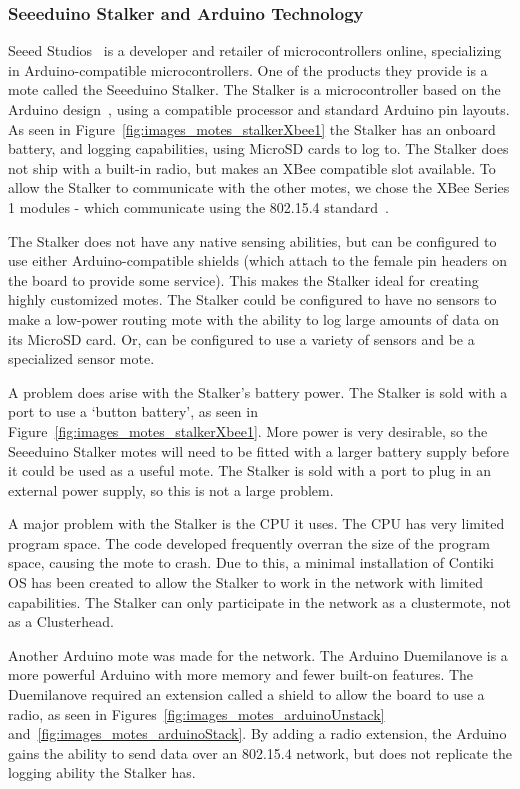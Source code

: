 \subsubsection {Seeeduino Stalker and Arduino Technology}
	Seeed Studios~\cite{seedstalker} is a developer and retailer of microcontrollers online, 
	specializing in Arduino-compatible microcontrollers. One of the products they provide
	is a mote called the Seeeduino Stalker. The Stalker is a microcontroller based on the 
	Arduino design~\cite{arduino}, using a compatible processor and standard Arduino pin layouts.
	As seen in Figure~\ref{fig:images_motes_stalkerXbee1} the
	Stalker has an onboard battery, and logging capabilities, using MicroSD cards to log to.
	The Stalker does not ship with a built-in radio, but makes an XBee compatible slot available. 
	To allow the Stalker to communicate with the other motes, we chose the XBee Series 1 
	modules - which communicate using the 802.15.4 standard~\cite{zigbee}.
	
	The Stalker does not have any native sensing abilities, but can be configured to use
	either Arduino-compatible shields (which attach to the female pin headers on the board 
	to provide some service). This makes the Stalker ideal for creating highly customized
	motes. The Stalker could be configured to have no sensors to make a low-power routing
	mote with the ability to log large amounts of data on its MicroSD card. Or, can be configured
	to use a variety of sensors and be a specialized sensor mote.
	
	A problem does arise with the Stalker's battery power. The Stalker is sold with a port to 
	use a `button battery', as seen in Figure~\ref{fig:images_motes_stalkerXbee1}. More power is 
	very desirable, so the Seeeduino Stalker motes will need to be fitted with a larger battery supply before
	it could be used as a useful mote.  The Stalker is sold with a port to plug in an external 
	power supply, so this is not a large problem.
	
	A major problem with the Stalker is the CPU it uses. The CPU has very limited program space. 
	The code developed frequently overran the size of the program space, causing the 
	mote to crash. Due to this, a minimal installation of Contiki OS has been created to 
	allow the Stalker to work in the network with limited capabilities. The Stalker
	can only participate in the network as a clustermote, not as a Clusterhead.
	
	Another Arduino mote was made for the network. The Arduino Duemilanove is a more powerful Arduino with 
	more memory and fewer built-on features. The Duemilanove required an extension called 
	a shield to allow the board to use a radio, as seen in Figures~\ref{fig:images_motes_arduinoUnstack} 
	and~\ref{fig:images_motes_arduinoStack}. By adding a radio extension, the Arduino gains 
	the ability to send data over an 802.15.4 network, but does not replicate the logging ability 
	the Stalker has. 
	

